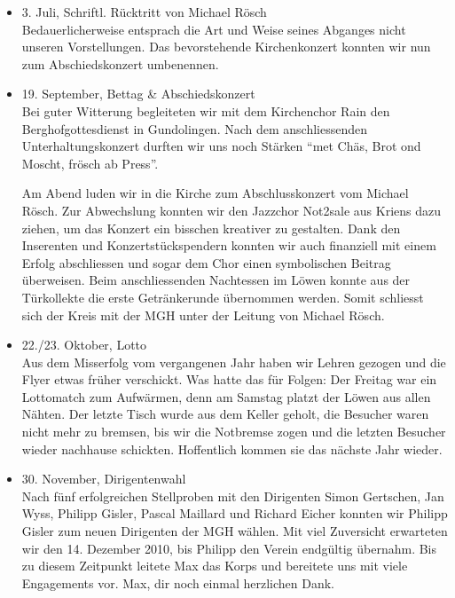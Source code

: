 \begin{history}
\begin{itemize}
        \item 3. Juli, Schriftl. Rücktritt von Michael Rösch\\
              Bedauerlicherweise entsprach die Art und Weise seines Abganges
              nicht unseren Vorstellungen. Das bevorstehende Kirchenkonzert
              konnten wir nun zum Abschiedskonzert umbenennen.

        \item 19. September, Bettag \& Abschiedskonzert\\
              Bei guter Witterung begleiteten wir mit dem Kirchenchor Rain den
              Berghofgottesdienst in Gundolingen. Nach dem anschliessenden
              Unterhaltungskonzert durften wir uns noch Stärken \enquote{met
                  Chäs, Brot ond Moscht, frösch ab Press}.

              Am Abend luden wir in die Kirche zum Abschlusskonzert vom Michael
              Rösch. Zur Abwechslung konnten wir den Jazzchor Not2sale aus
              Kriens dazu ziehen, um das Konzert ein bisschen kreativer zu
              gestalten. Dank den Inserenten und Konzertstückspendern konnten
              wir auch finanziell mit einem Erfolg abschliessen und sogar dem
              Chor einen symbolischen Beitrag überweisen. Beim anschliessenden
              Nachtessen im Löwen konnte aus der Türkollekte die erste
              Getränkerunde übernommen werden. Somit schliesst sich der Kreis
              mit der MGH unter der Leitung von Michael Rösch.

        \item 22./23. Oktober, Lotto\\
              Aus dem Misserfolg vom vergangenen Jahr haben wir Lehren gezogen
              und die Flyer etwas früher verschickt. Was hatte das für Folgen:
              Der Freitag war ein Lottomatch zum Aufwärmen, denn am Samstag
              platzt der Löwen aus allen Nähten. Der letzte Tisch wurde aus dem
              Keller geholt, die Besucher waren nicht mehr zu bremsen, bis wir
              die Notbremse zogen und die letzten Besucher wieder nachhause
              schickten. Hoffentlich kommen sie das nächste Jahr wieder.

        \item 30. November, Dirigentenwahl\\
              Nach fünf erfolgreichen Stellproben mit den Dirigenten Simon
              Gertschen, Jan Wyss, Philipp Gisler, Pascal Maillard und Richard
              Eicher konnten wir Philipp Gisler zum neuen Dirigenten der MGH
              wählen. Mit viel Zuversicht erwarteten wir den 14. Dezember 2010,
              bis Philipp den Verein endgültig übernahm. Bis zu diesem Zeitpunkt
              leitete Max das Korps und bereitete uns mit viele Engagements vor.
              Max, dir noch einmal herzlichen Dank.


\end{itemize}
\end{history}
